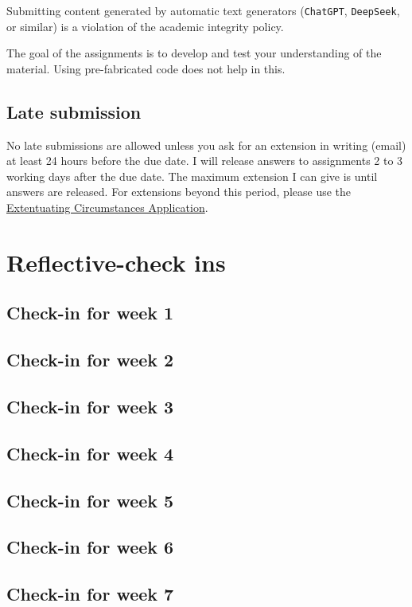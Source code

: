 \documentclass{amsart}
\begin{document}
Submitting content generated by automatic text generators (\texttt{ChatGPT}, \texttt{DeepSeek}, or similar) is a violation of the academic integrity policy.

The goal of the assignments is to develop and test your understanding of the material.
Using pre-fabricated code does not help in this.
\subsection*{Late submission}
\label{sec:org13aa4a5}
No late submissions are allowed unless you ask for an extension in writing (email) at least 24 hours before the due date.  I will release answers to assignments 2 to 3 working days after the due date.  The maximum extension I can give is until answers are released.  For extensions beyond this period, please use the \href{https://www.anu.edu.au/students/program-administration/assessments-exams/extenuating-circumstances-application}{Extentuating Circumstances Application}.
\section{Reflective-check ins}
\label{sec:org9f3454b}
\subsection{Check-in for week 1}
\label{sec:org08b0396}
\subsection{Check-in for week 2}
\label{sec:org480a1c9}
\subsection{Check-in for week 3}
\label{sec:org3a0bd65}
\subsection{Check-in for week 4}
\label{sec:orgaee64a7}
\subsection{Check-in for week 5}
\label{sec:org55cec22}
\subsection{Check-in for week 6}
\label{sec:org6c2aca8}
\subsection{Check-in for week 7}
\label{sec:org951516a}
\end{document}
